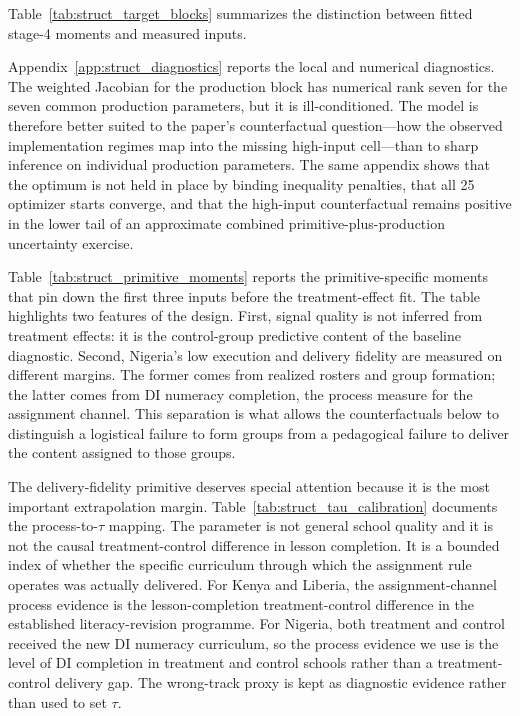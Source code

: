 \documentclass[11pt]{article}
\begin{document}
Table~\ref{tab:struct_target_blocks} summarizes the distinction between fitted stage-4 moments and measured inputs.



Appendix~\ref{app:struct_diagnostics} reports the local and numerical diagnostics. The weighted Jacobian for the production block has numerical rank seven for the seven common production parameters, but it is ill-conditioned. The model is therefore better suited to the paper's counterfactual question---how the observed implementation regimes map into the missing high-input cell---than to sharp inference on individual production parameters. The same appendix shows that the optimum is not held in place by binding inequality penalties, that all 25 optimizer starts converge, and that the high-input counterfactual remains positive in the lower tail of an approximate combined primitive-plus-production uncertainty exercise.

Table~\ref{tab:struct_primitive_moments} reports the primitive-specific moments that pin down the first three inputs before the treatment-effect fit. The table highlights two features of the design. First, signal quality is not inferred from treatment effects: it is the control-group predictive content of the baseline diagnostic. Second, Nigeria's low execution and delivery fidelity are measured on different margins. The former comes from realized rosters and group formation; the latter comes from DI numeracy completion, the process measure for the assignment channel. This separation is what allows the counterfactuals below to distinguish a logistical failure to form groups from a pedagogical failure to deliver the content assigned to those groups.



The delivery-fidelity primitive deserves special attention because it is the most important extrapolation margin. Table~\ref{tab:struct_tau_calibration} documents the process-to-$\tau$ mapping. The parameter is not general school quality and it is not the causal treatment-control difference in lesson completion. It is a bounded index of whether the specific curriculum through which the assignment rule operates was actually delivered. For Kenya and Liberia, the assignment-channel process evidence is the lesson-completion treatment-control difference in the established literacy-revision programme. For Nigeria, both treatment and control received the new DI numeracy curriculum, so the process evidence we use is the level of DI completion in treatment and control schools rather than a treatment-control delivery gap. The wrong-track proxy is kept as diagnostic evidence rather than used to set $\tau$.
\end{document}
